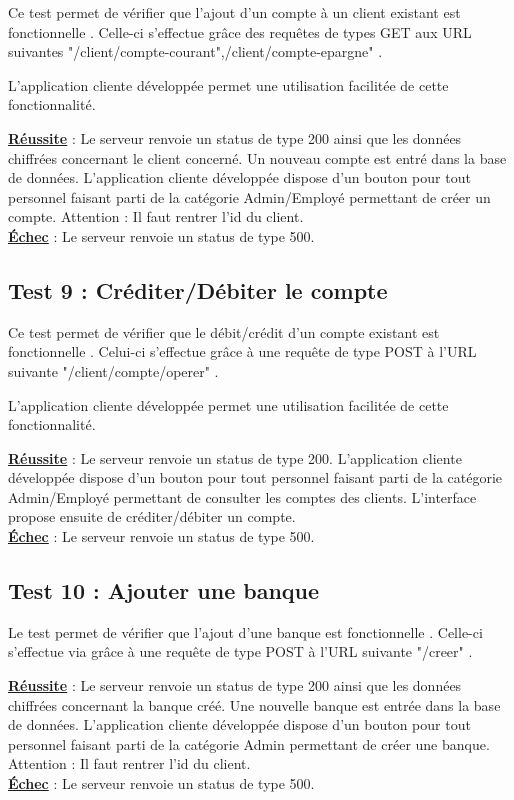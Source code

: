 Ce test permet de vérifier que l'ajout d'un compte à un client existant est fonctionnelle .
Celle-ci s'effectue grâce des requêtes de types GET aux URL suivantes "/client/compte-courant",/client/compte-epargne" .

L'application cliente développée permet une utilisation facilitée de cette fonctionnalité. 

\textbf{\underline{Réussite}} : Le serveur renvoie un status de type 200 ainsi que les données chiffrées concernant le client concerné. Un nouveau compte est entré dans la base de données.
L'application cliente développée dispose d'un bouton pour tout personnel faisant parti de la catégorie Admin/Employé permettant de créer un compte.
Attention : Il faut rentrer l'id du client.
\\
\textbf{\underline{Échec}} : Le serveur renvoie un status de type 500.

\subsection{Test 9 : Créditer/Débiter le compte}

Ce test permet de vérifier que le débit/crédit d'un compte existant est fonctionnelle .
Celui-ci s'effectue grâce à une requête de type POST à l'URL suivante "/client/compte/operer" .

L'application cliente développée permet une utilisation facilitée de cette fonctionnalité. 

\textbf{\underline{Réussite}} : Le serveur renvoie un status de type 200.
L'application cliente développée dispose d'un bouton pour tout personnel faisant parti de la catégorie Admin/Employé permettant de consulter les comptes des clients.
L'interface propose ensuite de créditer/débiter un compte.
\\
\textbf{\underline{Échec}} : Le serveur renvoie un status de type 500.

\subsection{Test 10 : Ajouter une banque}

Le test permet de vérifier que l'ajout d'une banque est fonctionnelle .
Celle-ci s'effectue via grâce à une requête de type POST à l'URL suivante "/creer" .

\textbf{\underline{Réussite}} : Le serveur renvoie un status de type 200 ainsi que les données chiffrées concernant la banque créé. Une nouvelle banque est entrée dans la base de données.
L'application cliente développée dispose d'un bouton pour tout personnel faisant parti de la catégorie Admin permettant de créer une banque.
Attention : Il faut rentrer l'id du client.
\\
\textbf{\underline{Échec}} : Le serveur renvoie un status de type 500.


